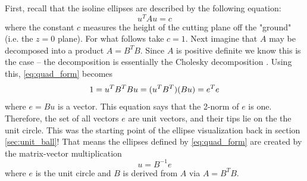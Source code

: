 \documentclass[onefignum,onetabnum]{siamart190516}
\begin{document}
First, recall that the isoline ellipses are described by the following equation:
\begin{equation}
u^T A u = c
\label{eq:quad_form}
\end{equation}
where the constant $c$ measures the height of the cutting plane off the "ground" 
(i.e. the $z = 0$ plane).  For what follows take $c=1$.
Next imagine that $A$ may be decomposed into a product
$A = B^T B$.  Since $A$ is positive definite we know this is the case --
the decomposition is essentially the Cholesky decomposition  \cite{Higham2020_Chol}.
Using this, \cref{eq:quad_form} becomes
\begin{equation}
1 = u^T B^T B u \\
= (u^T B^T) (B u) \\
= e^T e
\end{equation}
where $e = B u$ is a vector.  This equation says that the 2-norm of $e$ is one.  
Therefore, the set of all vectors $e$ are unit vectors, and their tips lie on the the unit circle.
This was the starting point of the ellipse visualization back in section \cref{sec:unit_ball}!  That
means the ellipses defined by \cref{eq:quad_form} are created by the matrix-vector
multiplication
$$
u = B^{-1} e
$$
where $e$ is the unit circle and $B$ is derived from $A$ via $A = B^T B$.
\end{document}
